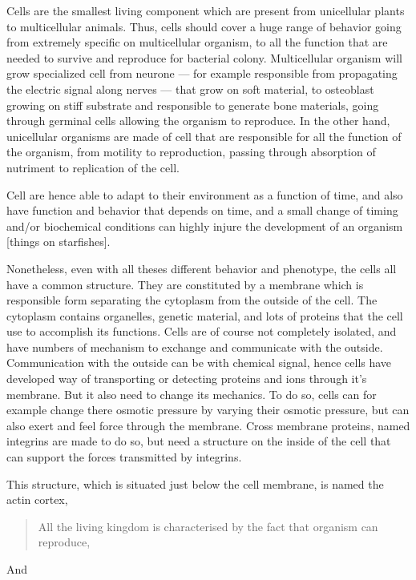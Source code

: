 \documentclass[A4paperpaper,11pt,english]{sphinxmanual}
\begin{document}
Cells are the smallest living component which are present from unicellular
plants to multicellular animals. Thus, cells should cover a huge range of
behavior going from extremely specific on multicellular organism, to all the
function that are needed to survive and reproduce for bacterial colony.
Multicellular organism will grow specialized cell from neurone — for example
responsible from propagating the electric signal along nerves — that grow on
soft material, to osteoblast growing on stiff substrate and responsible to
generate bone materials, going through germinal cells allowing the organism to
reproduce. In the other hand, unicellular organisms are made of cell that are
responsible for all the function of the organism, from motility to
reproduction, passing through absorption of nutriment to replication of the
cell.

Cell are hence able to adapt to their environment as a function of time, and
also have function and behavior that depends on time, and a small change of
timing and/or biochemical conditions can highly injure the development of an
organism {[}things on starfishes{]}.

Nonetheless, even with all theses different behavior and phenotype, the cells
all have a common structure. They are constituted by a membrane which is
responsible form separating the cytoplasm from the outside of the cell. The
cytoplasm contains organelles, genetic material, and lots of proteins that the
cell use to accomplish its functions. Cells are of course not completely
isolated, and have numbers of mechanism to exchange and communicate with the
outside. Communication with the outside can be with chemical signal, hence
cells have developed way of transporting or detecting proteins and ions through
it's membrane. But it also need to change its mechanics. To do so, cells can
for example change there osmotic pressure by varying their osmotic pressure,
but can also exert and feel force through the membrane. Cross membrane
proteins, named integrins are made to do so, but need a structure on the inside
of the cell that can support the forces transmitted by integrins.

This structure, which is situated just below the cell membrane, is named the actin cortex,
\begin{quote}

All the living kingdom is characterised by the fact that organism can reproduce,
\end{quote}

And
\end{document}
